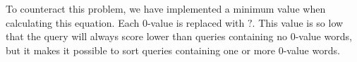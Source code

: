 To counteract this problem, we have implemented a minimum value when calculating this equation. 
Each 0-value is replaced with $?$. 
This value is so low that the query will always score lower than queries containing no 0-value words, but it makes it possible to sort queries containing one or more 0-value words.
